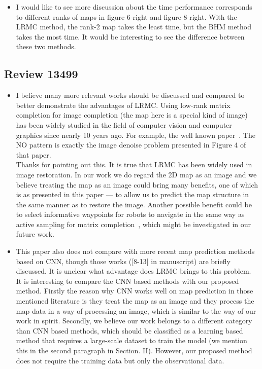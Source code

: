 \documentclass{article}
\newcommand{\response}[1]{{\color{black}\smallskip\\ #1 }}
\begin{document}
{\begin{itemize}
        \item
        I would like to see more
        discussion about the time performance corresponds to
        different ranks of maps in figure 6-right and figure
        8-right. With the LRMC method, the rank-2 map takes the
        least time, but the BHM method takes the most time. It
        would be interesting to see the difference between these two methods.  
        \response{}
        
\end{itemize}
}

\subsection*{Review 13499}
{\color{blue}
    \begin{itemize}
        
        \item
        I believe many more relevant works should be
        discussed and compared to better demonstrate the advantages
        of LRMC. Using low-rank matrix completion for image
        completion (the map here is a special kind of image) has
        been widely studied in the field of computer vision and
        computer graphics since nearly 10 years ago. For example,
        the well known paper~\cite{wright2010sparse}. The NO pattern is exactly
        the image denoise problem presented in Figure 4 of that
        paper.
        \response{Thanks for pointing out this. It is true that LRMC has been widely used in image restoration. In our work we do regard the 2D map as an image and we believe treating the map as an image could bring many benefits, one of which is as presented in this paper --- to allow us to predict the map structure in the same manner as to restore the image. Another possible benefit could be to select informative waypoints for robots to navigate in the same way as active sampling for matrix completion~\cite{mak2018maximum}, which might be investigated in our future work.
        }
        
        \item
        This paper also does not compare with more recent
        map prediction methods based on CNN, though those works
        ([8-13] in manuscript) are briefly discussed. It is unclear what advantage
        does LRMC brings to this problem.
        \response{It is interesting to compare the CNN based methods with our proposed method. Firstly the reason why CNN works well on map prediction in those mentioned literature is they treat the map as an image and they process the map data in a way of processing an image, which is similar to the way of our work in spirit. Secondly, we believe our work belongs to a different category than CNN based methods, which should be classified as a learning based method that requires a large-scale dataset to train the model (we mention this in the second paragraph in Section. II). However, our proposed method does not require the training data but only the observational data.
        }
        
\end{itemize}
}
\end{document}
